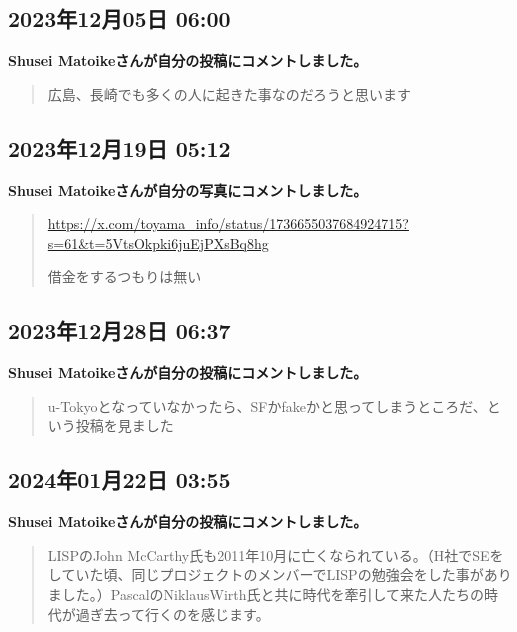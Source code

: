 \subsection*{2023年12月05日 06:00}

\textbf{Shusei Matoikeさんが自分の投稿にコメントしました。}

\begin{quote}
広島、長崎でも多くの人に起きた事なのだろうと思います
\end{quote}

\subsection*{2023年12月19日 05:12}

\textbf{Shusei Matoikeさんが自分の写真にコメントしました。}

\begin{quote}
\url{https://x.com/toyama_info/status/1736655037684924715?s=61&t=5VtsOkpki6juEjPXsBq8hg}

借金をするつもりは無い
\end{quote}

\subsection*{2023年12月28日 06:37}

\textbf{Shusei Matoikeさんが自分の投稿にコメントしました。}

\begin{quote}
u-Tokyoとなっていなかったら、SFかfakeかと思ってしまうところだ、という投稿を見ました
\end{quote}

\subsection*{2024年01月22日 03:55}

\textbf{Shusei Matoikeさんが自分の投稿にコメントしました。}

\begin{quote}
LISPのJohn McCarthy氏も2011年10月に亡くなられている。（H社でSEをしていた頃、同じプロジェクトのメンバーでLISPの勉強会をした事がありました。）PascalのNiklausWirth氏と共に時代を牽引して来た人たちの時代が過ぎ去って行くのを感じます。
\end{quote}

